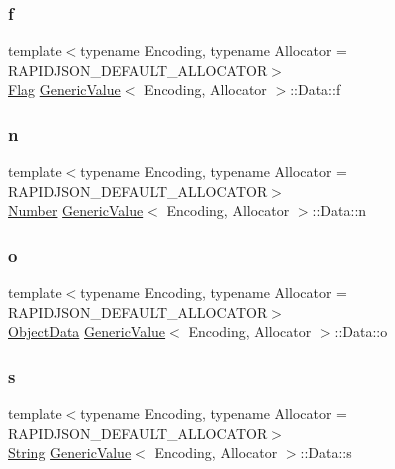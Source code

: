 \subsubsection{\texorpdfstring{f}{f}}
{\footnotesize\ttfamily template$<$typename Encoding, typename Allocator = R\+A\+P\+I\+D\+J\+S\+O\+N\+\_\+\+D\+E\+F\+A\+U\+L\+T\+\_\+\+A\+L\+L\+O\+C\+A\+T\+OR$>$ \\
\hyperlink{structGenericValue_1_1Flag}{Flag} \hyperlink{classGenericValue}{Generic\+Value}$<$ Encoding, Allocator $>$\+::Data\+::f}

\mbox{\label{unionGenericValue_1_1Data_a243007cce2f4b75bea3e3c1ee4c3c239}} 
\subsubsection{\texorpdfstring{n}{n}}
{\footnotesize\ttfamily template$<$typename Encoding, typename Allocator = R\+A\+P\+I\+D\+J\+S\+O\+N\+\_\+\+D\+E\+F\+A\+U\+L\+T\+\_\+\+A\+L\+L\+O\+C\+A\+T\+OR$>$ \\
\hyperlink{unionGenericValue_1_1Number}{Number} \hyperlink{classGenericValue}{Generic\+Value}$<$ Encoding, Allocator $>$\+::Data\+::n}

\mbox{\label{unionGenericValue_1_1Data_af6417eca530fba0d8bd65d309628eb11}} 
\subsubsection{\texorpdfstring{o}{o}}
{\footnotesize\ttfamily template$<$typename Encoding, typename Allocator = R\+A\+P\+I\+D\+J\+S\+O\+N\+\_\+\+D\+E\+F\+A\+U\+L\+T\+\_\+\+A\+L\+L\+O\+C\+A\+T\+OR$>$ \\
\hyperlink{structGenericValue_1_1ObjectData}{Object\+Data} \hyperlink{classGenericValue}{Generic\+Value}$<$ Encoding, Allocator $>$\+::Data\+::o}

\mbox{\label{unionGenericValue_1_1Data_a6872a4b93763944063b425e6c001ed2b}} 
\subsubsection{\texorpdfstring{s}{s}}
{\footnotesize\ttfamily template$<$typename Encoding, typename Allocator = R\+A\+P\+I\+D\+J\+S\+O\+N\+\_\+\+D\+E\+F\+A\+U\+L\+T\+\_\+\+A\+L\+L\+O\+C\+A\+T\+OR$>$ \\
\hyperlink{structGenericValue_1_1String}{String} \hyperlink{classGenericValue}{Generic\+Value}$<$ Encoding, Allocator $>$\+::Data\+::s}

